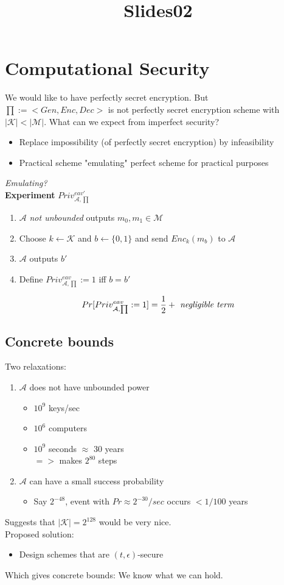 \documentclass[12pt]{article}
\title{Slides02}
\begin{document}
\maketitle
\tableofcontents
\newpage

\section{Computational Security}
We would like to have perfectly secret encryption. But $\prod:=<Gen,Enc,Dec>$ is not perfectly secret encryption scheme with $|\mathcal{K}| < |\mathcal{M}|$.
What can we expect from imperfect security?
\begin{itemize}
\item Replace impossibility (of perfectly secret encryption) by infeasibility
\item Practical scheme "emulating" perfect scheme for practical purposes 
\end{itemize}
\emph{Emulating?}\\
\textbf{Experiment} $Priv_{\mathcal{A},\prod}^{eav'}$

\begin{enumerate}
\item $\mathcal{A}$ \emph{not unbounded} outputs $m_0,m_1 \in \mathcal{M}$
\item Choose $k \leftarrow \mathcal{K}$ and  $b \leftarrow \{0,1\}$ and send $Enc_k(m_b)$ to $\mathcal{A}$
 \item $\mathcal{A}$ outputs $b'$
 \item Define $Priv_{\mathcal{A},\prod}^{eav}:=1$ iff $b=b'$
\end{enumerate}
\begin{equation}
Pr[Priv_{\mathcal{A},\prod}^{eav}:=1] = \frac{1}{2}+ \emph{ negligible term}
\end{equation}
\subsection{Concrete bounds}
Two relaxations:
\begin{enumerate}
\item $\mathcal{A}$ does not have unbounded power
	\begin{itemize}
	\item $10^9$ keys/sec
	\item $10^6$ computers
	\item $10^9$  seconds $\approx$ 30 years\\
	$=>$ makes $2^{80}$ steps
	\end{itemize}
\item $\mathcal{A}$ can have a small success probability
	\begin{itemize}
	\item Say $2^{-48}$, event with $Pr\approx 2^{-30}/sec$ occurs $<1/100$ years
	\end{itemize}
\end{enumerate}
Suggests that $|\mathcal{K}| = 2^{128}$ would be very nice.\\
Proposed solution:
\begin{itemize}
\item Design schemes that are $(t, \epsilon)$-secure
\end{itemize}
Which gives concrete bounds: We know what we can hold.
\newpage
\end{document}
